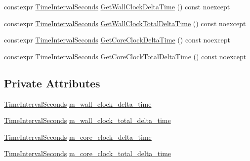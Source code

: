 \begin{DoxyCompactItemize}
\item 
constexpr \mbox{\hyperlink{namespacemage_a21c3d1575018d1e0720948713c76be1f}{Time\+Interval\+Seconds}} \mbox{\hyperlink{classmage_1_1_game_time_ae82a2db3b5f0e928407d27cd831629c5}{Get\+Wall\+Clock\+Delta\+Time}} () const noexcept
\item 
constexpr \mbox{\hyperlink{namespacemage_a21c3d1575018d1e0720948713c76be1f}{Time\+Interval\+Seconds}} \mbox{\hyperlink{classmage_1_1_game_time_ab272459ffe5c8c6637bde001035c3227}{Get\+Wall\+Clock\+Total\+Delta\+Time}} () const noexcept
\item 
constexpr \mbox{\hyperlink{namespacemage_a21c3d1575018d1e0720948713c76be1f}{Time\+Interval\+Seconds}} \mbox{\hyperlink{classmage_1_1_game_time_ad66a5ec29ac7729191597d874441bde8}{Get\+Core\+Clock\+Delta\+Time}} () const noexcept
\item 
constexpr \mbox{\hyperlink{namespacemage_a21c3d1575018d1e0720948713c76be1f}{Time\+Interval\+Seconds}} \mbox{\hyperlink{classmage_1_1_game_time_a1f98b37bfd8b285df69d2dc1d00c851e}{Get\+Core\+Clock\+Total\+Delta\+Time}} () const noexcept
\end{DoxyCompactItemize}
\subsection*{Private Attributes}
\begin{DoxyCompactItemize}
\item 
\mbox{\hyperlink{namespacemage_a21c3d1575018d1e0720948713c76be1f}{Time\+Interval\+Seconds}} \mbox{\hyperlink{classmage_1_1_game_time_ac4f77425277186cbd4a3219a38ae0a0a}{m\+\_\+wall\+\_\+clock\+\_\+delta\+\_\+time}}
\item 
\mbox{\hyperlink{namespacemage_a21c3d1575018d1e0720948713c76be1f}{Time\+Interval\+Seconds}} \mbox{\hyperlink{classmage_1_1_game_time_ac02186547dc6d0568df991b9de95d489}{m\+\_\+wall\+\_\+clock\+\_\+total\+\_\+delta\+\_\+time}}
\item 
\mbox{\hyperlink{namespacemage_a21c3d1575018d1e0720948713c76be1f}{Time\+Interval\+Seconds}} \mbox{\hyperlink{classmage_1_1_game_time_a2c48f0162e4ac75edb0124a22432a1f2}{m\+\_\+core\+\_\+clock\+\_\+delta\+\_\+time}}
\item 
\mbox{\hyperlink{namespacemage_a21c3d1575018d1e0720948713c76be1f}{Time\+Interval\+Seconds}} \mbox{\hyperlink{classmage_1_1_game_time_a497e7e9ad9cc20d0421dd55991e42caf}{m\+\_\+core\+\_\+clock\+\_\+total\+\_\+delta\+\_\+time}}
\end{DoxyCompactItemize}


